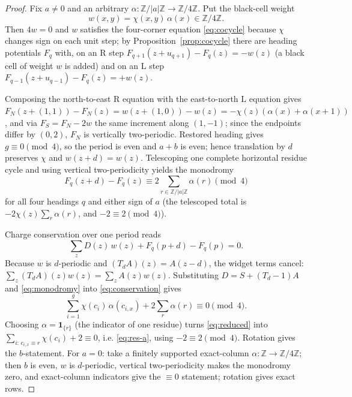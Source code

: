 \documentclass[11pt,reqno]{amsart}
\theoremstyle{plain}
\theoremstyle{definition}
\newcommand{\Z}{\mathbb{Z}}
\newcommand{\che}{\chi}                 %
\newcommand{\drift}{d}
\newcommand{\growth}{g}
\newcommand{\turnR}{\mathrm{R}}
\newcommand{\turnL}{\mathrm{L}}
\begin{document}
\begin{proof}[Proof]
Fix $a\neq0$ and an arbitrary $\alpha\colon\Z/|a|\Z\to\Z/4\Z$. Put the black-cell
weight
\begin{equation}\label{eq:weight}
w(x,y)=\che(x,y)\,\alpha(x)\in\Z/4\Z .
\end{equation}
Then $4w=0$ and $w$ satisfies the four-corner equation \eqref{eq:cocycle} because
$\che$ changes sign on each unit step; by Proposition~\ref{prop:cocycle} there
are heading potentials $F_q$ with, on an $\turnR$ step
$F_{q+1}(z+u_{q+1})-F_q(z)=-w(z)$ (a black cell of weight $w$ is added) and on an
$\turnL$ step $F_{q-1}(z+u_{q-1})-F_q(z)=+w(z)$.

Composing the north-to-east $\turnR$ equation with the east-to-north $\turnL$
equation gives $F_N(z+(1,1))-F_N(z)=w(z+(1,0))-w(z)=-\che(z)(\alpha(x)+\alpha(x+1))$,
and via $F_S=F_N-2w$ the same increment along $(1,-1)$; since the endpoints differ
by $(0,2)$, $F_N$ is vertically two-periodic. Restored heading gives
$\growth\equiv0\pmod4$, so the period is even and $a+b$ is even; hence translation
by $\drift$ preserves $\che$ and $w(z+\drift)=w(z)$. Telescoping one complete
horizontal residue cycle and using vertical two-periodicity yields the monodromy
\begin{equation}\label{eq:monodromy}
F_q(z+\drift)-F_q(z)\equiv 2\sum_{r\in\Z/|a|\Z}\alpha(r)\pmod4
\end{equation}
for all four headings $q$ and either sign of $a$ (the telescoped total is
$-2\che(z)\sum_r\alpha(r)$, and $-2\equiv2\pmod4$).

Charge conservation over one period reads
\begin{equation}\label{eq:conservation}
\sum_z D(z)\,w(z)+F_q(p+\drift)-F_q(p)=0 .
\end{equation}
Because $w$ is $\drift$-periodic and $(T_\drift A)(z)=A(z-\drift)$, the widget
terms cancel: $\sum_z(T_\drift A)(z)w(z)=\sum_z A(z)w(z)$. Substituting
$D=S+(T_\drift-1)A$ and \eqref{eq:monodromy} into \eqref{eq:conservation} gives
\begin{equation}\label{eq:reduced}
\sum_{i=1}^{\growth}\che(c_i)\,\alpha(c_{i,x})+2\sum_{r}\alpha(r)\equiv0\pmod4 .
\end{equation}
Choosing $\alpha=\mathbf 1_{\{r\}}$ (the indicator of one residue) turns
\eqref{eq:reduced} into $\sum_{i:\,c_{i,x}\equiv r}\che(c_i)+2\equiv0$, i.e.
\eqref{eq:res-a}, using $-2\equiv2\pmod4$. Rotation gives the $b$-statement. For
$a=0$: take a finitely supported exact-column $\alpha\colon\Z\to\Z/4\Z$; then $b$
is even, $w$ is $\drift$-periodic, vertical two-periodicity makes the monodromy
zero, and exact-column indicators give the $\equiv0$ statement; rotation gives
exact rows.
\end{proof}
\end{document}
